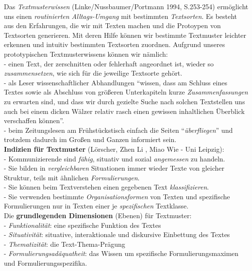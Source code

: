 \documentclass[
  letterpaper,
]{scrbook}
\begin{document}
Das \emph{Textmusterwissen} (Linke/Nussbaumer/Portmann 1994, S.253-254)
ermöglicht uns einen \emph{routinierten Alltags-Umgang} mit bestimmten
\emph{Textsorten}. Es besteht aus den Erfahrungen, die wir mit Texten
machen und die Protoypen von Textsorten generieren. Mit deren Hilfe
können wir bestimmte Textmuster leichter erkennen und intuitiv
bestimmten Textsorten zuordnen. Aufgrund unseres prototypischen
Textmusterwissens können wir nämlich:\\
- einen Text, der zerschnitten oder fehlerhaft angeordnet ist, wieder so
\emph{zusammensetzen}, wie sich für die jeweilige Textsorte gehört.\\
- als Leser wissenschaftlicher Abhandlungen ``wissen, dass am Schluss
eines Textes sowie als Abschluss von größeren Unterkapiteln kurze
\emph{Zusammenfassungen} zu erwarten sind, und dass wir durch gezielte
Suche nach solchen Textstellen uns auch bei einem dicken Wälzer relativ
rasch einen gewissen inhaltlichen Überblick verschaffen können''.\\
- beim Zeitungslesen am Frühstückstisch einfach die Seiten
``\emph{überfliegen}'' und trotzdem dadurch im Großen und Ganzen
informiert sein.\\

\textbf{Indizien für Textmuster} (Lörscher, Zhen Li , Miao Wie - Uni
Leipzig):\\
- Kommunizierende sind \emph{fähig}, situativ und sozial
\emph{angemessen} zu handeln.\\
- Sie bilden in \emph{vergleichbaren} Situationen immer wieder Texte von
gleicher Struktur, teils mit ähnlichen \emph{Formulierungen}.\\
- Sie können beim Textverstehen einen gegebenen Text
\emph{klassifizieren}.\\
- Sie verwenden bestimmte \emph{Organisationsformen} von Texten und
spezifische Formulierungen nur in Texten einer je \emph{spezifischen}
Textklasse.\\

Die \textbf{grundlegenden Dimensionen} (Ebenen) für Textmuster:\\
- \emph{Funktionalität}: eine spezifische Funktion des Textes\\
- \emph{Situativität}: situative, interaktionale und diskursive
Einbettung des Textes\\
- \emph{Thematizität}: die Text-Thema-Prägung\\
- \emph{Formulierungsadäquatheit}: das Wissen um spezifische
Formulierungsmaximen und Formulierungsspezifika.\\
\end{document}
